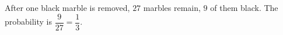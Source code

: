 After one black marble is removed, $27$ marbles remain, $9$ of them black. The probability is $\dfrac{9}{27}=\boxed{\dfrac13}$.
